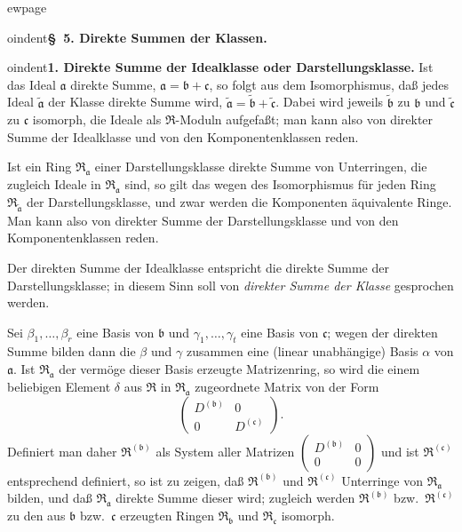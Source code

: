 \documentclass[12pt,a4paper]{article}
\newcommand{\mf}[1]{\mathfrak{#1}}     %
\newcommand{\ideala}{\mathfrak{a}}
\newcommand{\idealb}{\mathfrak{b}}
\newcommand{\idealc}{\mathfrak{c}}
\theoremstyle{definition}
\begin{document}
ewpage
\setcounter{page}{556}



oindent\textbf{\S~5. Direkte Summen der Klassen.}

\medskip



oindent\textbf{1. Direkte Summe der Idealklasse oder Darstellungsklasse.}
Ist das Ideal $\ideala$ direkte Summe, $\ideala = \idealb + \idealc$, so folgt
aus dem Isomorphismus, da\ss{} jedes Ideal $\tilde{\ideala}$ der Klasse direkte
Summe wird, $\tilde{\ideala} = \tilde{\idealb} + \tilde{\idealc}$. Dabei wird
jeweils $\tilde{\idealb}$ zu $\idealb$ und $\tilde{\idealc}$ zu $\idealc$
isomorph, die Ideale als $\mf{R}$-Moduln aufgefa\ss t; man kann also von
direkter Summe der Idealklasse und von den Komponentenklassen reden.

Ist ein Ring $\mf{R}_{\ideala}$ einer Darstellungsklasse direkte Summe von
Unterringen, die zugleich Ideale in $\mf{R}_{\ideala}$ sind, so gilt das
wegen des Isomorphismus f\"ur jeden Ring $\mf{R}_{\tilde{\ideala}}$ der
Darstellungsklasse, und zwar werden die Komponenten \"aquivalente Ringe.
Man kann also von direkter Summe der Darstellungsklasse und von den
Komponentenklassen reden.

Der direkten Summe der Idealklasse entspricht die direkte Summe der
Darstellungsklasse; in diesem Sinn soll von \textit{direkter Summe der Klasse}
gesprochen werden.

Sei $\beta_1,\dots,\beta_r$ eine Basis von $\idealb$ und
$\gamma_1,\dots,\gamma_t$ eine Basis von $\idealc$; wegen der direkten
Summe bilden dann die $\beta$ und $\gamma$ zusammen eine (linear
unabh\"angige) Basis $\alpha$ von $\ideala$. Ist $\mf{R}_{\ideala}$ der
verm\"oge dieser Basis erzeugte Matrizenring, so wird die einem beliebigen
Element $\delta$ aus $\mf{R}$ in $\mf{R}_{\ideala}$ zugeordnete Matrix von der
Form
\[
\begin{pmatrix}
D^{(\idealb)} & 0 \\
0 & D^{(\idealc)}
\end{pmatrix}.
\]
Definiert man daher $\mf{R}^{(\idealb)}$ als System aller Matrizen
$\begin{pmatrix} D^{(\idealb)} & 0 \\ 0 & 0 \end{pmatrix}$
und ist $\mf{R}^{(\idealc)}$ entsprechend definiert, so ist zu zeigen, da\ss{}
$\mf{R}^{(\idealb)}$ und $\mf{R}^{(\idealc)}$ Unterringe von
$\mf{R}_{\ideala}$ bilden, und da\ss{} $\mf{R}_{\ideala}$ direkte Summe dieser
wird; zugleich werden $\mf{R}^{(\idealb)}$ bzw.\ $\mf{R}^{(\idealc)}$ zu den
aus $\idealb$ bzw.\ $\idealc$ erzeugten Ringen $\mf{R}_{\idealb}$ und
$\mf{R}_{\idealc}$ isomorph.
\end{document}
